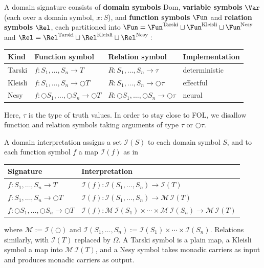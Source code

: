 \documentclass[anon]{../../journal-templates/NeSy26/nesy2026} %
\begin{document}
\begin{definition}
A domain signature consists of \textbf{domain symbols} $\mathrm{Dom}$, \textbf{variable symbols} $\Var$ (each over a domain symbol,
$x : S$), and \textbf{function symbols} $\Fun$ and \textbf{relation symbols} $\Rel$, each
partitioned into
$\Fun = \Fun^{\mathrm{Tarski}} \sqcup \Fun^{\mathrm{Kleisli}} \sqcup \Fun^{\mathrm{Nesy}}$ and $\Rel = \Rel^{\mathrm{Tarski}} \sqcup \Rel^{\mathrm{Kleisli}} \sqcup \Rel^{\mathrm{Nesy}}:$
\begin{center}\small
\begin{tabular}{@{}llll@{}}
\toprule
\textbf{Kind} & \textbf{Function symbol} & \textbf{Relation symbol} & \textbf{Implementation} \\
\midrule
Tarski  & $f : S_1,\ldots,S_n \to T$ & $R : S_1,\ldots,S_n \to \tau$ & deterministic \\[2pt]
Kleisli & $f : S_1,\ldots,S_n \to \bigcirc T$ & $R : S_1,\ldots,S_n \to \bigcirc\tau$ & effectful \\[2pt]
Nesy    & $f : \bigcirc S_1,\ldots,\bigcirc S_n \to \bigcirc T$
        & $R : \bigcirc S_1,\ldots,\bigcirc S_n \to \bigcirc\tau$ & neural \\
\bottomrule
\end{tabular}
\end{center}
Here, $\tau$ is the type of truth values.
In order to stay close to FOL, we disallow function and relation symbols taking arguments of type $\tau$ or $\bigcirc\tau$.
\end{definition}

\begin{definition} A domain interpretation assigns a set
$\mathcal I(S)$ to each domain symbol $S$, and to each function symbol $f$ a map $\mathcal I(f)$ as in
\begin{center}\small
\begin{tabular}{@{}ll@{}}
\toprule
\textbf{Signature} & \textbf{Interpretation} \\
\midrule
$f : S_1,\ldots,S_n \to T$
  & $\mathcal I(f) \colon \mathcal I(S_1,\ldots,S_n) \to \mathcal I(T)$ \\[3pt]
$f : S_1,\ldots,S_n \to \bigcirc T$
  & $\mathcal I(f) \colon \mathcal I(S_1,\ldots,S_n) \to \mathcal M\,\mathcal I(T)$ \\[3pt]
$f : \bigcirc S_1,\ldots,\bigcirc S_n \to \bigcirc T$
  & $\mathcal I(f) \colon \mathcal M\,\mathcal I(S_1) \times \cdots
     \times \mathcal M\,\mathcal I(S_n) \to \mathcal M\,\mathcal I(T)$ \\
\bottomrule
\end{tabular}
\end{center}
where $\mathcal M := \mathcal I(\bigcirc)$ and
$\mathcal I(S_1,\ldots,S_n) := \mathcal I(S_1) \times \cdots \times \mathcal I(S_n)$. Relations similarly, with $\mathcal I(T)$ replaced by $\Omega$. A Tarski symbol is a plain map, a Kleisli symbol a map into
$\mathcal M\,\mathcal I(T)$, and a Nesy symbol takes monadic carriers as input and produces monadic carriers as output.
\end{definition}
\end{document}
